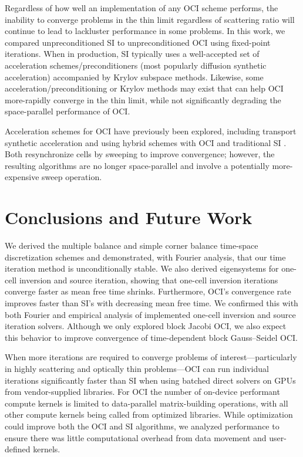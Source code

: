 Regardless of how well an implementation of any OCI scheme performs, the inability to converge problems in the thin limit regardless of scattering ratio will continue to lead to lackluster performance in some problems.
In this work, we compared unpreconditioned SI to unpreconditioned OCI using fixed-point iterations.
When in production, SI typically uses a well-accepted set of acceleration schemes/preconditioners (most popularly diffusion synthetic acceleration) accompanied by Krylov subspace methods.
Likewise, some acceleration/preconditioning or Krylov methods may exist that can help OCI more-rapidly converge in the thin limit, while not significantly degrading the space-parallel performance of OCI.

Acceleration schemes for OCI have previously been explored, including transport synthetic acceleration \cite{tsa2009rosa} and using hybrid schemes with OCI and traditional SI \cite{hoagland_hybrid_2021}.
Both resynchronize cells by sweeping to improve convergence; however, the resulting algorithms are no longer space-parallel and involve a potentially more-expensive sweep operation.

\section{Conclusions and Future Work}

We derived the multiple balance and simple corner balance time-space discretization schemes and demonstrated, with Fourier analysis, that our time iteration method is unconditionally stable.
We also derived eigensystems for one-cell inversion and source iteration, showing that one-cell inversion iterations converge faster as mean free time shrinks.
Furthermore, OCI's convergence rate improves faster than SI's with decreasing mean free time.
We confirmed this with both Fourier and empirical analysis of implemented one-cell inversion and source iteration solvers.
Although we only explored block Jacobi OCI, we also expect this behavior to improve convergence of time-dependent block Gauss--Seidel OCI.

When more iterations are required to converge problems of interest---particularly in highly scattering and optically thin problems---OCI can run individual iterations significantly faster than SI when using batched direct solvers on GPUs from vendor-supplied libraries.
For OCI the number of on-device performant compute kernels is limited to data-parallel matrix-building operations, with all other compute kernels being called from optimized libraries. 
While optimization could improve both the OCI and SI algorithms, we analyzed performance to ensure there was little computational overhead from data movement and user-defined kernels.

